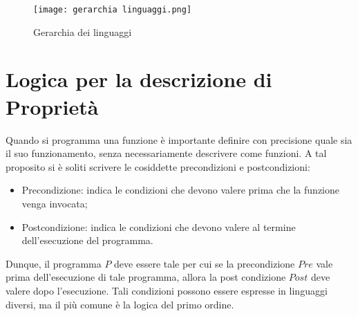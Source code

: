 \begin{figure}[!h]
  \centering
  \texttt{[image: gerarchia linguaggi.png]} 
  \caption{Gerarchia dei linguaggi}
\end{figure}

\break

\section{Logica per la descrizione di Proprietà}
Quando si programma una funzione è importante definire con precisione quale sia il suo funzionamento, senza necessariamente descrivere come funzioni. A tal proposito si è soliti scrivere le cosiddette precondizioni e postcondizioni:
\begin{itemize}
  \item Precondizione: indica le condizioni che devono valere prima che la funzione venga invocata;
  \item Postcondizione: indica le condizioni che devono valere al termine dell'esecuzione del programma.  
\end{itemize}

Dunque, il programma \(P\) deve essere tale per cui se la precondizione \(Pre\) vale prima dell'esecuzione di tale programma, allora la post condizione \(Post\) deve valere dopo l'esecuzione. Tali condizioni possono essere espresse in linguaggi diversi, ma il più comune è la logica del primo ordine.